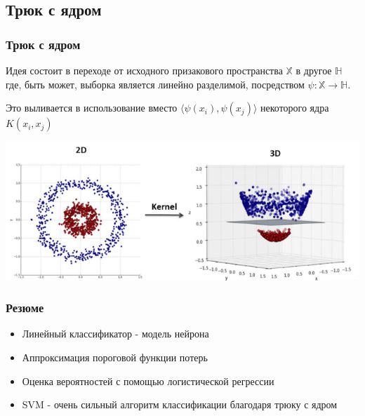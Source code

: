 \documentclass{beamer}
\begin{document}
	\subsection{Трюк с ядром}
	
	\begin{frame}
		\frametitle{Трюк с ядром}
		Идея состоит в переходе от исходного призакового пространства $\mathbb{X}$ в другое $\mathbb{H}$ где, быть может, выборка является линейно разделимой, посредством $\psi: \mathbb{X} \rightarrow \mathbb{H}$. 
		
		Это выливается в использование вместо $\langle \psi (x_i), \psi (x_j) \rangle$ некоторого ядра $K(x_i, x_j)$
		
		\includegraphics[width=1\textwidth]{img/kernel_trick.png}
	\end{frame}
	
	\begin{frame}
		\frametitle{Резюме}
		
		\begin{itemize}
			\item Линейный классификатор - модель нейрона
			\item Аппроксимация пороговой функции потерь
			\item Оценка вероятностей с помощью логистической регрессии
			\item SVM - очень сильный алгоритм классификации благодаря трюку с ядром
		\end{itemize}
	\end{frame}
\end{document}
